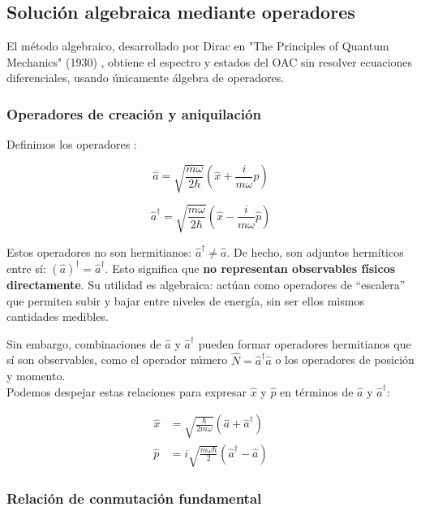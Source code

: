 \documentclass[11pt,a4paper,spanish]{book}
\begin{document}
	
\subsection{Solución algebraica mediante operadores}

El método algebraico, desarrollado por Dirac en "The Principles of Quantum Mechanics" (1930) \cite{dirac1930}, obtiene el espectro y estados del OAC sin resolver ecuaciones diferenciales, usando únicamente álgebra de operadores.

\subsubsection{Operadores de creación y aniquilación}

Definimos los operadores \cite{dirac1930}:

\begin{equation}
	\hat{a} = \sqrt{\frac{m\omega}{2\hbar}}\left(\hat{x} + \frac{i}{m\omega}\hat{p}\right)
\end{equation}

\begin{equation}
	\hat{a}^\dagger = \sqrt{\frac{m\omega}{2\hbar}}\left(\hat{x} - \frac{i}{m\omega}\hat{p}\right)
\end{equation}

Estos operadores no son hermitianos: $\hat{a}^\dagger \neq \hat{a}$.
De hecho, son adjuntos hermíticos entre sí: $(\hat{a})^\dagger = \hat{a}^\dagger$. Esto significa que \textbf{no representan observables físicos directamente}. Su utilidad es algebraica: actúan como operadores de ``escalera'' que permiten subir y bajar entre niveles de energía, sin ser ellos mismos cantidades medibles.

Sin embargo, combinaciones de $\hat{a}$ y $\hat{a}^\dagger$ pueden formar operadores hermitianos que sí son observables, como el operador número $\hat{N} = \hat{a}^\dagger\hat{a}$ o los operadores de posición y momento.\\

Podemos despejar estas relaciones para expresar $\hat{x}$ y $\hat{p}$ en términos de $\hat{a}$ y $\hat{a}^\dagger$:

\begin{align}
	\hat{x} &= \sqrt{\frac{\hbar}{2m\omega}}(\hat{a} + \hat{a}^\dagger) \\
	\hat{p} &= i\sqrt{\frac{m\omega\hbar}{2}}(\hat{a}^\dagger - \hat{a})
\end{align}

\subsubsection{Relación de conmutación fundamental}
\end{document}
